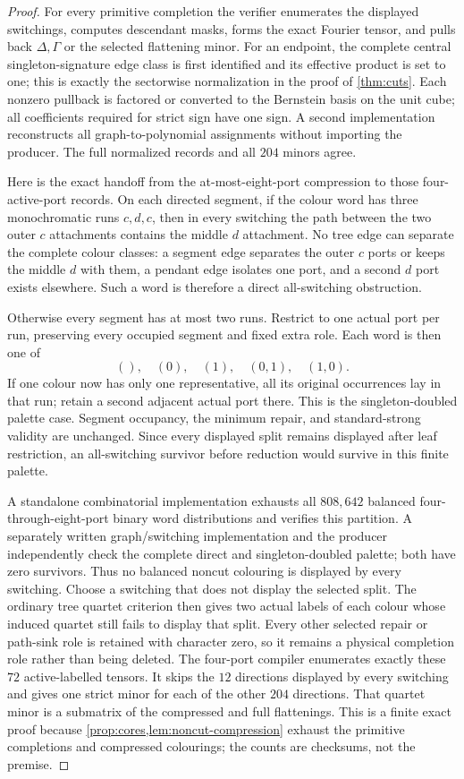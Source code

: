 \documentclass[11pt]{article}
\theoremstyle{remark}
\begin{document}
\begin{proof}
For every primitive completion the verifier enumerates the displayed
switchings, computes descendant masks, forms the exact Fourier tensor, and
pulls back $\Delta,\Gamma$ or the selected flattening minor.  For an endpoint,
the complete central singleton-signature edge class is first identified and
its effective product is set to one; this is exactly the sectorwise
normalization in the proof of \cref{thm:cuts}.  Each nonzero pullback is
factored or converted to the Bernstein basis on the unit cube; all
coefficients required for strict sign have one sign.  A second implementation
reconstructs all graph-to-polynomial assignments without importing the
producer.  The full normalized records and all $204$ minors agree.

Here is the exact handoff from the at-most-eight-port compression to those
four-active-port records.  On each directed segment, if the colour word has
three monochromatic runs $c,d,c$, then in every switching the path between
the two outer $c$ attachments contains the middle $d$ attachment.  No tree
edge can separate the complete colour classes: a segment edge separates the
outer $c$ ports or keeps the middle $d$ with them, a pendant edge isolates one
port, and a second $d$ port exists elsewhere.  Such a word is therefore a
direct all-switching obstruction.

Otherwise every segment has at most two runs.  Restrict to one actual port
per run, preserving every occupied segment and fixed extra role.  Each word
is then one of
\[
(),\quad(0),\quad(1),\quad(0,1),\quad(1,0).
\]
If one colour now has only one representative, all its original occurrences
lay in that run; retain a second adjacent actual port there.  This is the
singleton-doubled palette case.  Segment occupancy, the minimum repair, and
standard-strong validity are unchanged.  Since every displayed split remains
displayed after leaf restriction, an all-switching survivor before reduction
would survive in this finite palette.

A standalone combinatorial implementation exhausts all $808{,}642$ balanced
four-through-eight-port binary word distributions and verifies this
partition.  A separately written graph/switching implementation and the
producer independently check the complete direct and singleton-doubled
palette; both have zero survivors.  Thus no balanced noncut colouring is
displayed by every switching.
Choose a switching that does not display the selected split.  The ordinary
tree quartet criterion then gives two actual labels of each colour whose
induced quartet still fails to display that split.  Every other selected
repair or path-sink role is retained with character zero, so it remains a
physical completion role rather than being deleted.  The four-port compiler
enumerates exactly these $72$ active-labelled tensors.  It skips the $12$
directions displayed by every switching and gives one strict minor for each
of the other $204$ directions.  That quartet minor is a submatrix of the
compressed and full flattenings.  This is a finite exact proof because
\cref{prop:cores,lem:noncut-compression} exhaust the primitive completions and
compressed colourings; the counts are checksums, not the premise.
\end{proof}
\end{document}
